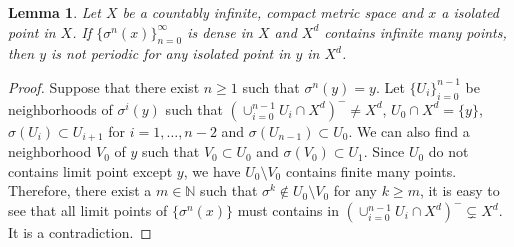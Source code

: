 \documentclass[a4paper,10pt]{amsart}
\newtheorem{lemma}{Lemma}[section]
\newcommand{\N}{\mathbb N} %
\begin{document}
\begin{lemma}\label{c_lam2}
   Let $X$ be a countably infinite, compact metric space and 
   $x$ a isolated point in $X$. If $\{ \sigma^{n}(x) \}_{n=0}^{\infty}$ 
   is dense in $X$ and $X^{d}$ contains infinite many points,
   then $y$ is not periodic for any isolated point in $y$ in $X^{d}$. 
\end{lemma}

\begin{proof}
    Suppose that there exist $n \geq 1$ such that $\sigma^n(y) = y$.  
    Let $\{U_i\}_{i=0}^{n-1}$ be neighborhoods of $\sigma^{i}(y)$ such
    that $(\cup^{n-1}_{i=0}U_i \cap X^{d})^{-} \neq X^{d}$,
    $U_0 \cap X^{d} = \{y\}$, $\sigma(U_i) \subset U_{i+1}$ for 
    $i = 1, \ldots, n-2$ and $\sigma(U_{n-1}) \subset U_{0}$. We
    can also find a neighborhood $V_0$ of $y$ such that $V_0 \subset U_0$
    and $\sigma(V_0) \subset U_1$. Since $U_0$ do not contains limit
    point except $y$, we have $U_0 \setminus V_0$ contains finite many
    points. Therefore, there exist a $m \in \N$ such that 
    $\sigma^{k} \notin U_0 \setminus V_0$ for any $k \geq m$, 
    it is easy to see that all limit points of $\{\sigma^{n}(x)\}$ must
    contains in $(\cup^{n-1}_{i=0}U_i \cap X^{d})^{-} \subsetneq X^{d}$. 
    It is a contradiction.
\end{proof}
\end{document}
